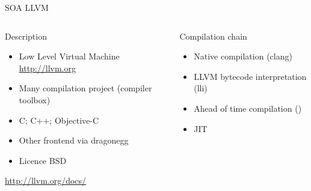 %
\begin{Frame}{SOA LLVM}
  \begin{columns}[t]
    \begin{column}{5cm} %
      \begin{block}{Description}
        \begin{itemize}
        \item Low Level Virtual Machine \url{http://llvm.org}
        \item Many compilation project (compiler toolbox)
        \item C; C++; Objective-C
        \item Other frontend via dragonegg
        \item Licence BSD
        \end{itemize}
      \end{block} 
\href{http://llvm.org/docs/}{http://llvm.org/docs/}
    \end{column}
    
    \begin{column}{5cm} %
      \begin{block}{Compilation chain}
        \begin{itemize}
        \item Native compilation (clang)
        \item LLVM bytecode interpretation (lli)
        \item Ahead of time compilation ()
        \item JIT
        \end{itemize}
      \end{block}   
    \end{column}
  \end{columns}  
\end{Frame}


